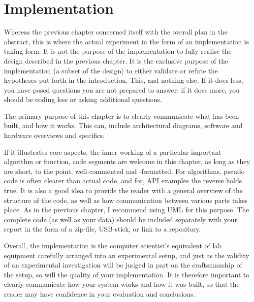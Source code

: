 \chapter{Implementation}
\label{cha:implementation}

Whereas the previous chapter concerned itself with the overall plan in
the abstract, this is where the actual experiment in the form of an
implementation is taking form.  It is not the purpose of the
implementation to fully realise the design described in the previous
chapter. It is the exclusive purpose of the implementation (a subset
of the design) to either validate or refute the hypotheses put forth
in the introduction. This, and nothing else. If it does less, you have
posed questions you are not prepared to answer; if it does more, you
should be coding less or asking additional questions.

The primary purpose of this chapter is to clearly communicate what has
been built, and how it works. This can, \eg include architectural
diagrams, software and hardware overviews and specifics.

If it illustrates core aspects, \eg the inner working of a particular
important algorithm or function, code segments are welcome in this
chapter, as long as they are short, to the point, well-commented and
-formatted.  For algorithms, pseudo code is often clearer than actual
code, and for, \eg \acs{API} examples the reverse holds true.  It is
also a good idea to provide the reader with a general overview of the
structure of the code, as well as how communication between various
parts takes place.  As in the previous chapter, I recommend using
\ac{UML} for this purpose.  The complete code (as well as your data)
should be included separately with your report in the form of a
zip-file, USB-stick, or link to a repository.

Overall, the implementation is the computer scientist's equivalent of
lab equipment carefully arranged into an experimental setup, and just
as the validity of an experimental investigation will be judged in
part on the craftsmanship of the setup, so will the quality of your
implementation. It is therefore important to clearly communicate how
your system works and how it was built, so that the reader may have
confidence in your evaluation and conclusions.



